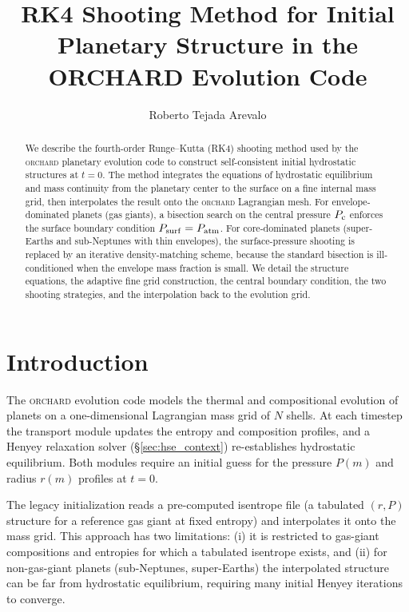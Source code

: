 \documentclass{aastex631}
\newcommand{\Pc}{P_{\rm c}}
\newcommand{\Patm}{P_{\rm atm}}
\newcommand{\Psurf}{P_{\rm surf}}
\newcommand{\orchard}{\textsc{orchard}}
\begin{document}
\title{RK4 Shooting Method for Initial Planetary Structure in
  the ORCHARD Evolution Code}

\author{Roberto Tejada Arevalo}

\begin{abstract}
We describe the fourth-order Runge--Kutta (RK4) shooting method used
by the \orchard{} planetary evolution code to construct self-consistent
initial hydrostatic structures at $t=0$.  The method integrates the
equations of hydrostatic equilibrium and mass continuity from the
planetary center to the surface on a fine internal mass grid, then
interpolates the result onto the \orchard{} Lagrangian mesh.  For
envelope-dominated planets (gas giants), a bisection search on the
central pressure $\Pc$ enforces the surface boundary condition
$\Psurf = \Patm$.  For core-dominated planets (super-Earths and
sub-Neptunes with thin envelopes), the surface-pressure shooting is
replaced by an iterative density-matching scheme, because the standard
bisection is ill-conditioned when the envelope mass fraction is small.
We detail the structure equations, the adaptive fine grid construction,
the central boundary condition, the two shooting strategies, and the
interpolation back to the evolution grid.
\end{abstract}


\section{Introduction}\label{sec:intro}

The \orchard{} evolution code models the thermal and compositional
evolution of planets on a one-dimensional Lagrangian mass grid of $N$
shells.  At each timestep the transport module updates the entropy and
composition profiles, and a Henyey relaxation solver
(\S\ref{sec:hse_context}) re-establishes hydrostatic equilibrium.  Both
modules require an initial guess for the pressure $P(m)$ and radius
$r(m)$ profiles at $t=0$.

The legacy initialization reads a pre-computed isentrope file (a
tabulated $(r,P)$ structure for a reference gas giant at fixed entropy)
and interpolates it onto the mass grid.  This approach has two
limitations: (i) it is restricted to gas-giant compositions and
entropies for which a tabulated isentrope exists, and (ii) for
non-gas-giant planets (sub-Neptunes, super-Earths) the interpolated
structure can be far from hydrostatic equilibrium, requiring many
initial Henyey iterations to converge.
\end{document}
